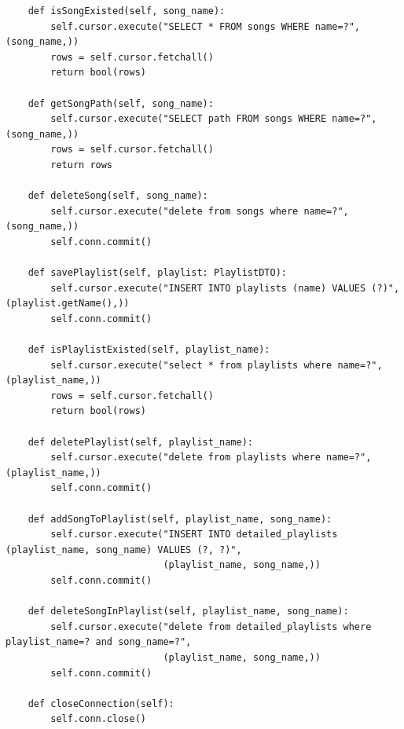 \documentclass[a4paper]{article}
\begin{document}
\begin{mdframed}[hidealllines=true,backgroundcolor=magenta!10]
\begin{lstlisting}
    def isSongExisted(self, song_name):
        self.cursor.execute("SELECT * FROM songs WHERE name=?", (song_name,))
        rows = self.cursor.fetchall()
        return bool(rows)

    def getSongPath(self, song_name):
        self.cursor.execute("SELECT path FROM songs WHERE name=?", (song_name,))
        rows = self.cursor.fetchall()
        return rows

    def deleteSong(self, song_name):
        self.cursor.execute("delete from songs where name=?", (song_name,))
        self.conn.commit()

    def savePlaylist(self, playlist: PlaylistDTO):
        self.cursor.execute("INSERT INTO playlists (name) VALUES (?)", (playlist.getName(),))
        self.conn.commit()

    def isPlaylistExisted(self, playlist_name):
        self.cursor.execute("select * from playlists where name=?", (playlist_name,))
        rows = self.cursor.fetchall()
        return bool(rows)

    def deletePlaylist(self, playlist_name):
        self.cursor.execute("delete from playlists where name=?", (playlist_name,))
        self.conn.commit()

    def addSongToPlaylist(self, playlist_name, song_name):
        self.cursor.execute("INSERT INTO detailed_playlists (playlist_name, song_name) VALUES (?, ?)", 
                            (playlist_name, song_name,))
        self.conn.commit()

    def deleteSongInPlaylist(self, playlist_name, song_name):
        self.cursor.execute("delete from detailed_playlists where playlist_name=? and song_name=?", 
                            (playlist_name, song_name,))
        self.conn.commit()

    def closeConnection(self):
        self.conn.close()

\end{lstlisting}
\end{mdframed}
\end{document}
